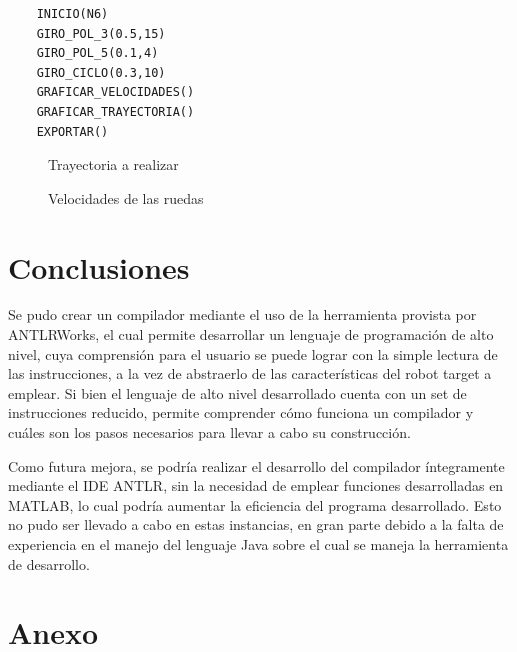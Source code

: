 \documentclass[12pt,a4paper]{article}
\begin{document}
    \begin{verbatim}
    INICIO(N6)
    GIRO_POL_3(0.5,15)
    GIRO_POL_5(0.1,4)
    GIRO_CICLO(0.3,10)
    GRAFICAR_VELOCIDADES()
    GRAFICAR_TRAYECTORIA()
    EXPORTAR()
	\end{verbatim}
    
    \begin{figure}[H]
    \centering
    
    \caption{Trayectoria a realizar}
    \label{fig:Trayectoria_a_realizar}
    \end{figure}
    
    \begin{figure}[H]
    \centering
    
    \caption{Velocidades de las ruedas}
    \label{fig:Velocidades}
    \end{figure}
    
    
    \section{Conclusiones}
    
	Se pudo crear un compilador mediante el uso de la herramienta provista por ANTLRWorks, el cual permite desarrollar un lenguaje de programación de alto nivel, cuya comprensión para el usuario se puede lograr con la simple lectura de las instrucciones, a la vez de abstraerlo de las características del robot target a emplear.
    Si bien el lenguaje de alto nivel desarrollado cuenta con un set de instrucciones reducido, permite comprender cómo funciona un compilador y cuáles son los pasos necesarios para llevar a cabo su construcción.
    
    Como futura mejora, se podría realizar el desarrollo del compilador íntegramente mediante el IDE ANTLR, sin la necesidad de emplear funciones desarrolladas en MATLAB, lo cual podría aumentar la eficiencia del programa desarrollado. Esto no pudo ser llevado a cabo en estas instancias, en gran parte debido a la falta de experiencia en el manejo del lenguaje Java sobre el cual se maneja la herramienta de desarrollo.
    
    
    \newpage
    
    \section{Anexo}
    
\end{document}
